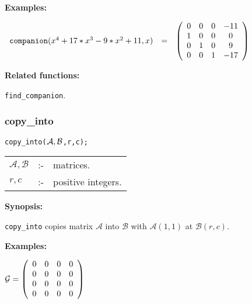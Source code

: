 {\bf Examples:}

\begin{flushleft}  
\hspace*{0.1in}
\begin{math}  
\begin{array}{ccc}
{\tt companion}(x^4+17*x^3-9*x^2+11,x) & = & 
\left( \begin{array}{cccc} 0 & 0 & 0 & -11 \\ 1 & 0 & 0 & 0 \\ 
0 & 1 & 0 & 9 \\ 0 & 0 & 1 & -17 
\end{array} \right)
\end{array}
\end{math}  
\end{flushleft}

{\bf Related functions:}

\hspace*{0.175in} {\tt find\_companion}.


\subsubsection{copy\_into}
\label{linalg:copy_into}

\hspace*{0.175in} {\tt copy\_into(${\cal A,B}$,r,c);}

\hspace*{0.1in} 
\begin{tabular}{l l l}
$\mathcal{A,B}$ &:-& matrices. \\
$r,c$          &:-& positive integers. 
\end{tabular}

{\bf Synopsis:} %

\hspace*{0.175in} {\tt copy\_into} copies matrix $\mathcal{A}$ into 
                $\mathcal{B}$ with $\mathcal{A}(1,1)$ at $\mathcal{B}(r,c)$.

{\bf Examples:} 

\begin{flushleft}
\hspace*{0.175in}
\begin{math}  
{\cal G} = \left( \begin{array}{cccc} 0 & 0 & 0 & 0 \\ 0 & 0 & 0 & 0 \\
0 & 0 & 0 & 0 \\ 0 & 0 & 0 & 0
\end{array} \right)
\end{math}  
\end{flushleft}

